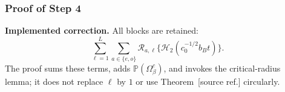 \documentclass[twoside,11pt]{article}
\makeatletter
\newcommand{\implementedchange}[1]{%
  \par\smallskip\noindent
  {\color{revisionred}\textbf{Implemented correction.} #1}%
  \par\smallskip}
\newcommand{\discardlabel}[1]{}
\newcommand{\discardtwo}[2]{}
\newcommand{\legacyref}[1]{\textup{[source ref.]}}
\newcommand{\legacyeqref}[1]{\textup{[source equation]}}
\newenvironment{legacycomparison}{%
  \begingroup\color{legacygray}%
  \let\label\discardlabel
  \let\originallabel\discardlabel
  \let\ref\legacyref
  \let\pageref\legacyref
  \let\eqref\legacyeqref
  \let\cref\legacyref
  \let\Cref\legacyref
  \let\autoref\legacyref
  \let\aliasref\discardtwo
}{\endgroup}
\newcommand{\aliasref}[2]{%
  \@ifundefined{r@#2}{}{%
    \expandafter\let\csname r@#1\expandafter\endcsname\csname r@#2\endcsname}}
\makeatother
\begin{document}
\begin{legacycomparison}










\subsubsection{Proof of Step 4}
\implementedchange{All blocks are retained:
\[
\sum_{\ell=1}^{L}\sum_{a\in\{e,o\}}
\mathcal R_{a,\ell}\{\mathcal H_2(c_0^{-1/2}b_Bt)\}.
\]
The proof sums these terms, adds $\mathbb P(\Omega_\beta^c)$, and invokes the critical-radius lemma; it does not replace $\ell$ by $1$ or use Theorem~\ref{Theorem_1} circularly.}


\end{legacycomparison}
\end{document}
